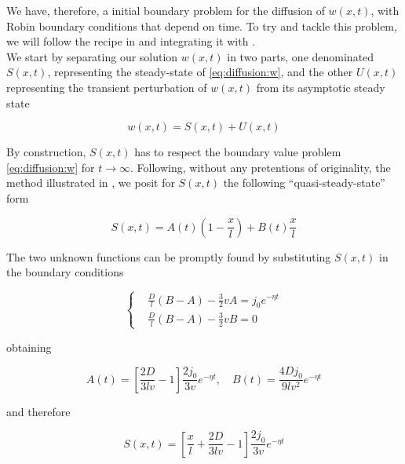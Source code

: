 \documentclass[a4paper, 10pt]{article}
\begin{document}
  We have, therefore, a initial boundary problem for the diffusion of $w(x,t)$,
  with Robin boundary conditions that depend on time. To try and tackle this
  problem, we will follow the recipe in \cite{Drbek2007ElementsOP} and
  integrating it with \cite{Salsa2022PartialDE}.\\ 
  We start by separating our solution $w(x,t)$ in two parts, one denominated
  $S(x,t)$, representing the steady-state of \eqref{eq:diffusion:w}, and the
  other $U(x,t)$ representing the transient perturbation of $w(x,t)$ from its
  asymptotic steady state

  \begin{equation}
    w(x,t) = S(x,t) + U(x,t)
  \end{equation}
  
  By construction, $S(x,t)$ has to respect the boundary value problem
  \eqref{eq:diffusion:w} for $t \to \infty$. Following, without any pretentions
  of originality, the method illustrated in \cite{Drbek2007ElementsOP}, we posit
  for $S(x,t)$ the following ``quasi-steady-state'' form

  \begin{equation}
    S(x,t) = A(t) \left(1 - \frac{x}{l}\right) + B(t)\frac{x}{l}
  \end{equation}

  The two unknown functions can be promptly found by substituting $S(x,t)$ in
  the boundary conditions

  \begin{equation}
    \left\{\begin{aligned}
      &\frac{D}{l}\left(B-A\right) - \frac{3}{2}v A = j_0e^{-\eta t}\\
      &\frac{D}{l}\left(B-A\right) - \frac{3}{2}v B = 0
    \end{aligned}\right.
  \end{equation}

  obtaining
  
  \begin{equation}
    A(t) = \left[\frac{2D}{3lv}-1\right]\frac{2 j_0}{3 v} e^{-\eta t}, \quad
    B(t) = \frac{4D j_0}{9 l v^2} e^{-\eta t}
  \end{equation}

  and therefore 

  \begin{equation}
    S(x,t) = \left[\frac{x}{l} + \frac{2D}{3lv} - 1\right] \frac{2
    j_0}{3v}e^{-\eta t}
  \end{equation}
\end{document}
